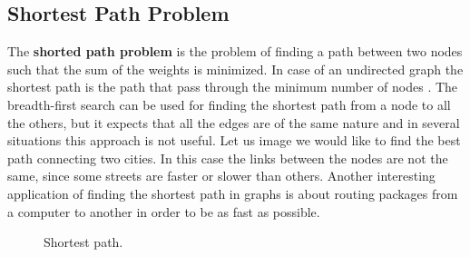 \subsection{Shortest Path Problem}
The \textbf{shorted path problem} is the problem of finding a path between two nodes such that the sum of the weights is minimized. In case of an undirected graph the shortest path is the path that pass through the minimum number of nodes \cite{wikishortestpath}. The breadth-first search can be used for finding the shortest path from a node to all the others, but it expects that all the edges are of the same nature and in several situations this approach is not useful. Let us image we would like to find the best path connecting two cities. In this case the links between the nodes are not the same, since some streets are faster or slower than others. Another interesting application of finding the shortest path in graphs is about routing packages from a computer to another in order to be as fast as possible.

\begin{figure}[H]

\centering
{}

\caption[Shortest path.]{Shortest path.}
\label{graphs_11}
\end{figure}

